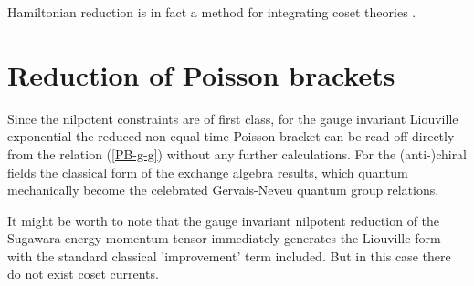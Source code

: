 \documentclass[a4paper,12]{article}
\begin{document}
Hamiltonian reduction is
in fact a method for integrating coset theories \cite{FJW}.

\section{Reduction of Poisson brackets}

Since the nilpotent constraints are of first class, for the gauge
invariant Liouville exponential \coordHE{}
the reduced non-equal time Poisson bracket can be read off directly
from the relation (\ref{PB-g-g}) without any further calculations. For
the (anti-)chiral fields \coordHE{} the classical form of the exchange algebra results, which quantum
mechanically become the celebrated Gervais-Neveu quantum group
relations.

It might be worth to note that the gauge invariant 
nilpotent reduction of the Sugawara
energy-momentum tensor immediately generates the 
Liouville form with the standard classical 'improvement' term
included. But in this case there do not exist coset currents.
\end{document}
